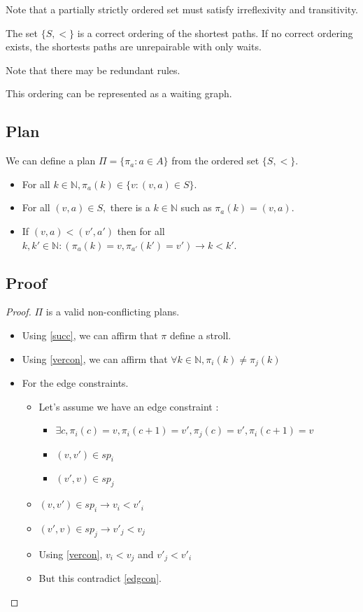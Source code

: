 Note that a partially strictly ordered set must satisfy irreflexivity and transitivity.

The set $\{S,<\}$ is a correct ordering of the shortest paths.
If no correct ordering exists, the shortests paths are unrepairable with only waits.

Note that there may be redundant rules.

This ordering can be represented as a waiting graph.

\subsection{Plan}

We can define a plan $\Pi = \{\pi_a : a\in A\}$ from the ordered set $\{S,<\}$.

\begin{itemize}
  \item For all $k\in \mathbb{N}, \pi_a(k)\in\{v:(v,a)\in S\}$.
  \item For all $(v,a)\in S,$ there is a $k \in \mathbb{N}$ such as $\pi_a(k)=(v,a)$.
  \item If $(v,a)<(v',a')$ then for all $k,k'\in \mathbb{N} : (\pi_{a}(k)=v, \pi_{a'}(k')=v') \rightarrow k<k'$.
\end{itemize}

\subsection{Proof}

\begin{proof}
$\Pi$ is a valid non-conflicting plans.

\begin{itemize}
  \item Using \ref{succ}, we can affirm that $\pi$ define a stroll. 
  \item Using \ref{vercon}, we can affirm that $\forall k\in \mathbb{N}, \pi_i(k) \not= \pi_j(k)$
  \item For the edge constraints.
  \begin{itemize}
    \item Let's assume we have an edge constraint :
    \begin{itemize}
      \item $\exists c, \pi_i(c)=v, \pi_i(c+1)=v',\pi_j(c)=v', \pi_i(c+1)=v$
      \item $(v,v') \in sp_i$
      \item $(v',v) \in sp_j$
    \end{itemize}
    \item $(v,v') \in sp_i \rightarrow v_i < v'_i$
    \item $(v',v) \in sp_j \rightarrow v'_j < v_j$
    \item Using \ref{vercon}, $v_i < v_j$ and $v'_j < v'_i$
    \item But this contradict \ref{edgcon}.
  \end{itemize}
\end{itemize}

\end{proof}
